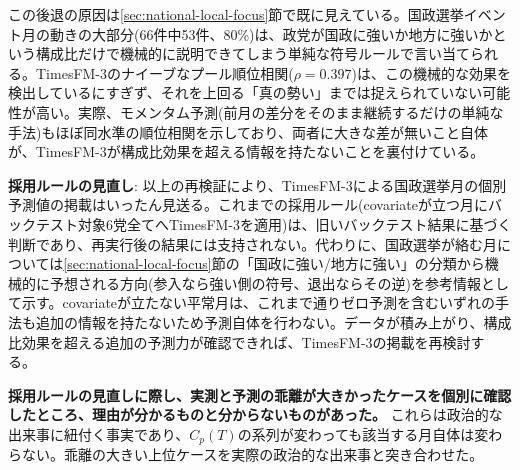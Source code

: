 \documentclass[a4paper,11pt]{ltjsarticle}
\begin{document}
この後退の原因は\ref{sec:national-local-focus}節で既に見えている。国政選挙イベント月の動きの大部分(66件中53件、80\%)は、政党が国政に強いか地方に強いかという構成比だけで機械的に説明できてしまう単純な符号ルールで言い当てられる。TimesFM-3のナイーブなプール順位相関($\rho=0.397$)は、この機械的な効果を検出しているにすぎず、それを上回る「真の勢い」までは捉えられていない可能性が高い。実際、モメンタム予測(前月の差分をそのまま継続するだけの単純な手法)もほぼ同水準の順位相関を示しており、両者に大きな差が無いこと自体が、TimesFM-3が構成比効果を超える情報を持たないことを裏付けている。

\textbf{採用ルールの見直し}: 以上の再検証により、TimesFM-3による国政選挙月の個別予測値の掲載はいったん見送る。これまでの採用ルール(covariateが立つ月にバックテスト対象6党全てへTimesFM-3を適用)は、旧いバックテスト結果に基づく判断であり、再実行後の結果には支持されない。代わりに、国政選挙が絡む月については\ref{sec:national-local-focus}節の「国政に強い/地方に強い」の分類から機械的に予想される方向(参入なら強い側の符号、退出ならその逆)を参考情報として示す。covariateが立たない平常月は、これまで通りゼロ予測を含むいずれの手法も追加の情報を持たないため予測自体を行わない。データが積み上がり、構成比効果を超える追加の予測力が確認できれば、TimesFM-3の掲載を再検討する。

\textbf{採用ルールの見直しに際し、実測と予測の乖離が大きかったケースを個別に確認したところ、理由が分かるものと分からないものがあった。} これらは政治的な出来事に紐付く事実であり、$C_p(T)$の系列が変わっても該当する月自体は変わらない。乖離の大きい上位ケースを実際の政治的な出来事と突き合わせた。
\end{document}
